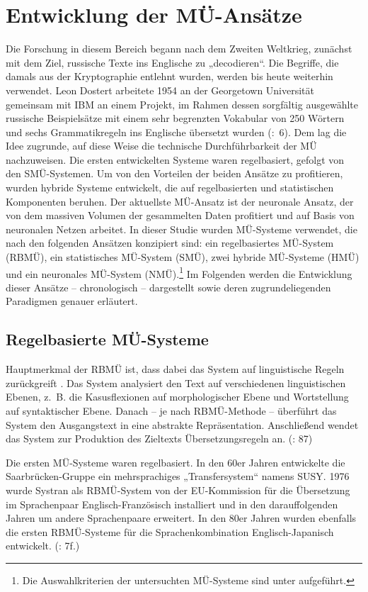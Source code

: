 \section{\label{sec:3.2}Entwicklung der MÜ-Ansätze}

Die Forschung in diesem Bereich begann nach dem Zweiten Weltkrieg, zunächst mit dem Ziel, russische Texte ins Englische zu „decodieren“. Die Begriffe, die damals aus der Kryptographie entlehnt wurden, werden bis heute weiterhin verwendet. Leon Dostert arbeitete 1954 an der Georgetown Universität gemeinsam mit IBM an einem Projekt, im Rahmen dessen sorgfältig ausgewählte russische Beispielsätze mit einem sehr begrenzten Vokabular von 250 Wörtern und sechs Grammatikregeln ins Englische übersetzt wurden (\citealt{HutchinsSomers1992}:~6). Dem lag die Idee zugrunde, auf diese Weise die technische Durchführbarkeit der MÜ nachzuweisen. Die ersten entwickelten Systeme waren regelbasiert, gefolgt von den SMÜ-Systemen. Um von den Vorteilen der beiden Ansätze zu profitieren, wurden hybride Systeme entwickelt, die auf regelbasierten und statistischen Komponenten beruhen. Der aktuellste MÜ-Ansatz ist der neuronale Ansatz, der von dem massiven Volumen der gesammelten Daten profitiert und auf Basis von neuronalen Netzen arbeitet. In dieser Studie wurden MÜ-Systeme verwendet, die nach den folgenden Ansätzen konzipiert sind: ein regelbasiertes MÜ-System (RBMÜ), ein statistisches MÜ-System (SMÜ), zwei hybride MÜ-Systeme (HMÜ) und ein neuronales MÜ-System (NMÜ).\footnote{Die Auswahlkriterien der untersuchten MÜ-Systeme sind unter  aufgeführt.} Im Folgenden werden die Entwicklung dieser Ansätze -- chronologisch -- dargestellt sowie deren zugrundeliegenden Paradigmen genauer erläutert.

\subsection{Regelbasierte MÜ-Systeme}
\label{sec:3.2.1}
Hauptmerkmal der RBMÜ ist, dass dabei das System auf linguistische Regeln zurückgreift \citep[38]{Ramlow2008}. Das System analysiert den Text auf verschiedenen linguistischen Ebenen, z.~B. die Kasusflexionen auf morphologischer Ebene und Wortstellung auf syntaktischer Ebene. Danach -- je nach RBMÜ-Methode -- überführt das System den Ausgangstext in eine abstrakte Repräsentation. Anschließend wendet das System zur Produktion des Zieltexts Übersetzungsregeln an. (\citealt{WerthmannWitt2014}: 87)

Die ersten MÜ-Systeme waren regelbasiert. In den 60er Jahren entwickelte die Saarbrücken-Gruppe ein mehrsprachiges „Transfersystem“ namens SUSY. 1976 wurde Systran als RBMÜ-System von der EU-Kommission für die Übersetzung im Sprachenpaar Englisch-Französisch installiert und in den darauffolgenden Jahren um andere Sprachenpaare erweitert. In den 80er Jahren wurden ebenfalls die ersten RBMÜ-Systeme für die Sprachenkombination Englisch-Japanisch entwickelt. (\citealt{HutchinsSomers1992}: 7f.)

